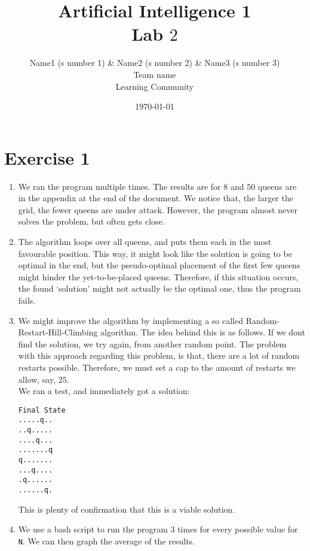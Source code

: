 \documentclass{article}
\title{{\bf Artificial Intelligence 1} \\ Lab $2$}%
\author{
Name1 (s number 1) \& Name2 (s number 2) \& Name3 (s number 3) \\ 
Team name \\
Learning Community
} %
\date{\today}%
\begin{document}
\maketitle

\section*{Exercise 1}
\begin{enumerate}[1.]
\item We ran the program multiple times. The results are for $8$ and $50$ queens are in the appendix at the end of the document. We notice that, the larger the grid, the fewer queens are under attack. However, the program almost never solves the problem, but often gets close. 
\item The algorithm loops over all queens, and puts them each in the most favourable position. This way, it might look like the solution is going to be optimal in the end, but the pseudo-optimal placement of the first few queens might hinder the yet-to-be-placed queens. Therefore, if this situation occurs, the found `solution' might not actually be the optimal one, thus the program fails.
\item We might improve the algorithm by implementing a so called Random-Restart-Hill-Climbing algorithm. The idea behind this is as follows. If we dont find the solution, we try again, from another random point. The problem with this approach regarding this problem, is that, there are a lot of random restarts possible. Therefore, we must set a cap to the amount of restarts we allow, say, $25$.\\
We ran a test, and immediately got a solution:
\begin{verbatim}
Final State
.....q..
..q.....
....q...
.......q
q.......
...q....
.q......
......q.
\end{verbatim}
This is plenty of confirmation that this is a viable solution.
\item We use a bash script to run the program 3 times for every possible value for \verb|N|. We can then graph the average of the results.\\


\end{enumerate}
\end{document}
